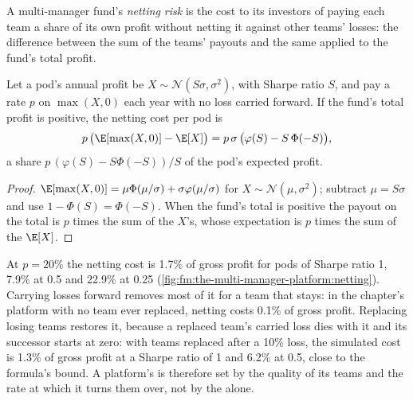 \begin{definition}\label{def:fm:the-multi-manager-platform:netting}
A multi-manager fund's \emph{netting risk} is the cost to its investors of paying each team a share of its own profit
without netting it against other teams' losses: the difference between the sum of the teams' payouts and the same  applied to the
fund's total profit.
\end{definition}

\begin{proposition}\label{prop:fm:the-multi-manager-platform:netting}
Let a pod's annual profit be $X\sim\mathcal N(S\sigma,\sigma^2)$, with Sharpe ratio $S$, and pay a rate $p$ on $\max(X,0)$ each year with no loss
carried forward. If the fund's total profit is positive, the netting cost per pod is
\[
p\,\bigl(\E[\max(X,0)]-\E[X]\bigr)=p\,\sigma\,\bigl(\varphi(S)-S\,\Phi(-S)\bigr),
\]
a share $p\,(\varphi(S)-S\Phi(-S))/S$ of the pod's expected profit.
\end{proposition}

\begin{proof}
$\E[\max(X,0)]=\mu\Phi(\mu/\sigma)+\sigma\varphi(\mu/\sigma)$ for $X\sim\mathcal N(\mu,\sigma^2)$; subtract $\mu=S\sigma$ and use
$1-\Phi(S)=\Phi(-S)$. When the fund's total is positive the payout on the total is $p$ times the sum of the $X$'s, whose expectation is $p$ times
the sum of the $\E[X]$.
\end{proof}

At $p=20\%$ the netting cost is 1.7\% of gross profit for pods of Sharpe ratio 1, 7.9\% at 0.5 and 22.9\% at 0.25
(\cref{fig:fm:the-multi-manager-platform:netting}). Carrying losses forward removes most of it for a team that stays: in the chapter's platform
with no team ever replaced, netting costs 0.1\% of gross profit. Replacing losing teams restores it, because a replaced team's carried loss dies
with it and its successor starts at zero: with teams replaced after a 10\% loss, the simulated cost is 1.3\% of gross profit at a Sharpe ratio of
1 and 6.2\% at 0.5, close to the formula's bound. A platform's  is therefore set by the quality of its teams and the rate at which it
turns them over, not by the  alone.

